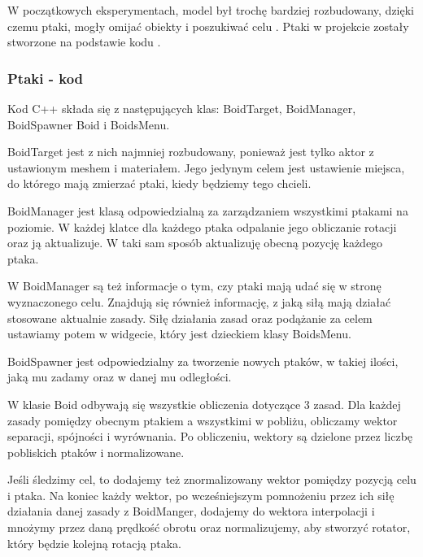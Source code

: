 \documentclass[a4paper,12pt,reqno]{article}
\begin{document}
W początkowych eksperymentach, model był trochę bardziej rozbudowany, dzięki czemu ptaki, mogły omijać obiekty i poszukiwać celu \cite{boids_reynolds}. Ptaki w projekcie zostały stworzone na podstawie kodu \cite{code_boids}.

\subsubsection{Ptaki - kod}

Kod C++ składa się z następujących klas: BoidTarget, BoidManager, BoidSpawner Boid i BoidsMenu.

BoidTarget jest z nich najmniej rozbudowany, ponieważ jest tylko aktor z ustawionym meshem i materiałem. Jego jedynym celem jest ustawienie miejsca, do którego mają zmierzać ptaki, kiedy będziemy tego chcieli.

BoidManager jest klasą odpowiedzialną za zarządzaniem wszystkimi ptakami na poziomie. W każdej klatce dla każdego ptaka odpalanie jego obliczanie rotacji oraz ją aktualizuje. W taki sam sposób aktualizuję obecną pozycję każdego ptaka.



W BoidManager są też informacje o tym, czy ptaki mają udać się w stronę wyznaczonego celu. Znajdują się również informację, z jaką siłą mają działać stosowane aktualnie zasady. Siłę działania zasad oraz podążanie za celem ustawiamy potem w widgecie, który jest dzieckiem klasy BoidsMenu.

BoidSpawner jest odpowiedzialny za tworzenie nowych ptaków, w takiej ilości, jaką mu zadamy oraz w danej mu odległości.

W klasie Boid odbywają się wszystkie obliczenia dotyczące 3 zasad. Dla każdej zasady pomiędzy obecnym ptakiem a wszystkimi w pobliżu, obliczamy wektor separacji, spójności i wyrównania. Po obliczeniu, wektory są dzielone przez liczbę pobliskich ptaków i normalizowane.



Jeśli śledzimy cel, to dodajemy też znormalizowany wektor pomiędzy pozycją celu i ptaka. Na koniec każdy wektor, po wcześniejszym pomnożeniu przez ich siłę działania danej zasady z BoidManger, dodajemy do wektora interpolacji i mnożymy przez daną prędkość obrotu oraz normalizujemy, aby stworzyć rotator, który będzie kolejną rotacją ptaka.
\end{document}
